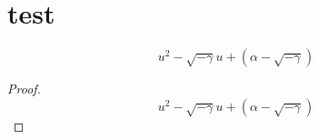 \documentclass[mathmodern,openany,11pt]{livre}
\begin{document}
\chapter{test}

\begin{equation}
u^2 - \sqrt{-\gamma}u + \left(\alpha - \sqrt{-\gamma}\right)
\end{equation}
\begin{proof}
\begin{equation}
u^2 - \sqrt{-\gamma}u + \left(\alpha - \sqrt{-\gamma}\right)
\end{equation}
\end{proof}
\end{document}
